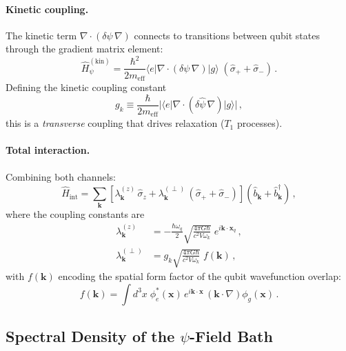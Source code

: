 \documentclass[aps,prl,twocolumn,superscriptaddress,nofootinbib,longbibliography]{revtex4-2}
\begin{document}
\paragraph{Kinetic coupling.}
The kinetic term $\nabla\cdot(\delta\psi\,\nabla)$ connects to
transitions between qubit states through the gradient matrix element:
\begin{equation}\label{eq:kin-coupling}
\hat{H}_\psi^{(\text{kin})} = \frac{\hbar^2}{2m_{\text{eff}}}
\langle e|\nabla\cdot(\delta\psi\,\nabla)|g\rangle\;
(\hat{\sigma}_+ + \hat{\sigma}_-)\,.
\end{equation}
Defining the kinetic coupling constant
\begin{equation}
g_k \equiv \frac{\hbar}{2m_{\text{eff}}}
|\langle e|\nabla\cdot(\delta\hat{\psi}\,\nabla)|g\rangle|\,,
\end{equation}
this is a \emph{transverse} coupling that drives relaxation ($T_1$
processes).

\paragraph{Total interaction.}
Combining both channels:
\begin{equation}\label{eq:H-int}
\hat{H}_{\text{int}} = \sum_\mathbf{k}
\left[\lambda_\mathbf{k}^{(z)}\,\hat{\sigma}_z
+ \lambda_\mathbf{k}^{(\perp)}\,(\hat{\sigma}_+ + \hat{\sigma}_-)\right]
(\hat{b}_\mathbf{k} + \hat{b}_\mathbf{k}^\dagger)\,,
\end{equation}
where the coupling constants are
\begin{align}
\lambda_\mathbf{k}^{(z)} &= -\frac{\hbar\omega_q}{2}
\sqrt{\frac{4\pi G\hbar}{c^2 V\omega_k}}\;
e^{i\mathbf{k}\cdot\mathbf{x}_q}\,,
\label{eq:lambda-z} \\[4pt]
\lambda_\mathbf{k}^{(\perp)} &= g_k
\sqrt{\frac{4\pi G\hbar}{c^2 V\omega_k}}\;
f(\mathbf{k})\,,
\label{eq:lambda-perp}
\end{align}
with $f(\mathbf{k})$ encoding the spatial form factor of the qubit
wavefunction overlap:
\begin{equation}
f(\mathbf{k}) = \int d^3x\;
\phi_e^*(\mathbf{x})\,e^{i\mathbf{k}\cdot\mathbf{x}}
\,(\mathbf{k}\cdot\nabla)\phi_g(\mathbf{x})\,.
\end{equation}

\subsection{Spectral Density of the $\psi$-Field Bath}
\end{document}
